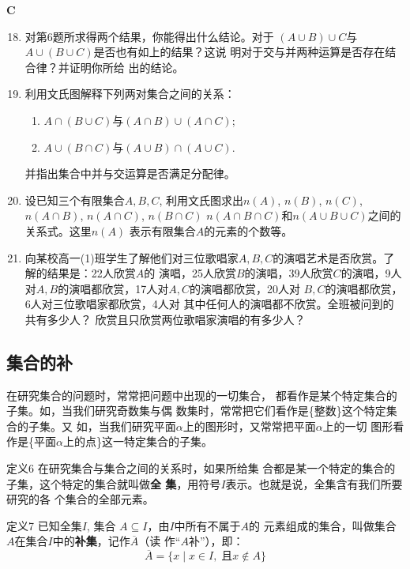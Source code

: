 \begin{center}
    \bfseries C
\end{center}

\begin{enumerate}
    \setcounter{enumi}{17}
    \item 对第6题所求得两个结果，你能得出什么结论。对于
    $(A\cup B)\cup C$与$A\cup (B\cup C)$是否也有如上的结果？这说
    明对于交与并两种运算是否存在结合律？并证明你所给
    出的结论。
    \item 利用文氏图解释下列两对集合之间的关系：
    \begin{enumerate}[(1)]
        \item $A\cap (B\cup C)$与$(A\cap B)\cup (A\cap C)$;
    \item $A\cup (B\cap C)$与$(A\cup B)\cap (A\cup C)$.
    \end{enumerate}
    并指出集合中并与交运算是否满足分配律。
    \item 设已知三个有限集合$A,B,C$, 利用文氏图求出$n(A)$, 
    $n(B)$, $n(C)$, $n(A\cap B)$, $n(A\cap C)$, 
    $n(B\cap C)$
    $n(A\cap B\cap C)$和$n(A\cup B\cup C)$之间的关系式。这里$n(A)$
    表示有限集合$A$的元素的个数等。
    \item 向某校高一(1)班学生了解他们对三位歌唱家$A,B,
    C$的演唱艺术是否欣赏。了解的结果是：22人欣赏$A$的
    演唱，25人欣赏$B$的演唱，39人欣赏$C$的演唱，9人对$A,
B$的演唱都欣赏，17人对$A,C$的演唱都欣赏，20人对
$B,C$的演唱都欣赏，6人对三位歌唱家都欣赏，4人对
其中任何人的演唱都不欣赏。全班被问到的共有多少人？
欣赏且只欣赏两位歌唱家演唱的有多少人？
\end{enumerate}


\subsection{集合的补}
在研究集合的问题时，常常把问题中出现的一切集合，
都看作是某个特定集合的子集。如，当我们研究奇数集与偶
数集时，常常把它们看作是\{整数\}这个特定集合的子集。又
如，当我们研究平面$\alpha$上的图形时，又常常把平面$\alpha$上的一切
图形看作是\{平面$\alpha$上的点\}这一特定集合的子集。

\begin{thm}
    {定义6} 在研究集合与集合之间的关系时，如果所给集
合都是某一个特定的集合的子集，这个特定的集合就叫做\textbf{全
集}，用符号$I$表示。也就是说，全集含有我们所要研究的各
个集合的全部元素。
\end{thm}

\begin{thm}{定义7}
    已知全集$I$, 集合
    $A\subseteq I$，由$I$中所有不属于$A$的
    元素组成的集合，叫做集合$A$在集合$I$中的\textbf{补集}，记作$\overline{A}$（读
    作“$A$补”），即：
\[    \overline{A}=\{x\mid x\in I,\;\text{且}x\notin A\}\]
\end{thm}

